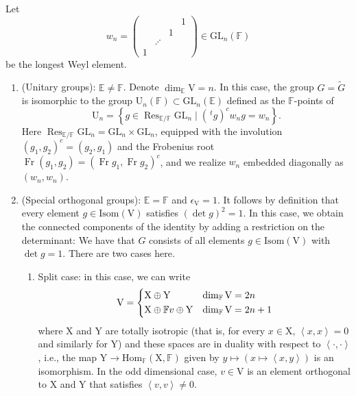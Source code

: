 \documentclass[12pt, reqno]{amsart}
\theoremstyle{definition}
\theoremstyle{definition}
\theoremstyle{definition}
\newcommand{\Hom}{\mathrm{Hom}}
\newcommand{\hermitianSpace}{\mathrm{V}}
\newcommand{\xIsotropic}{\mathrm{X}}
\newcommand{\yIsotropic}{\mathrm{Y}}
\newcommand{\innerproduct}[2]{\left\langle #1,#2\right\rangle}
\newcommand{\transpose}[1]{\, {}^{t}#1}
\newcommand{\involution}[1]{#1^{c}}
\newcommand{\GL}{\mathrm{GL}}
\newcommand{\UnitaryGroup}{\mathrm{U}}
\newcommand{\GroupExtension}[1]{\widetilde{#1}}
\newcommand{\finiteField}{\mathbb{F}}
\newcommand{\quadraticExtension}{\mathbb{E}}
\newcommand{\Frobenius}{\operatorname{Fr}}
\newcommand{\restrictionOfScalars}[3]{\operatorname{Res}_{#1 \slash #2}{#3}}
\newcommand{\IsometryGroup}{\mathrm{Isom}}
\newcommand{\algebraicGroup}[1]{\boldsymbol{\mathrm{#1}}}
\begin{document}
Let $$w_n = \begin{pmatrix}
	& & & 1\\
	& & 1\\
	& \iddots\\
	1
\end{pmatrix} \in \GL_n\left(\finiteField\right)$$ be the longest Weyl element.
\begin{enumerate}
	\item (Unitary groups): $\quadraticExtension \ne \finiteField$. Denote $\dim_{\quadraticExtension} \hermitianSpace = n$. In this case, the group $G = \GroupExtension{G}$ is isomorphic to the group $\UnitaryGroup_n\left(\finiteField\right) \subset\GL_{n}\left(\quadraticExtension\right)$ defined as the $\finiteField$-points of $$\algebraicGroup{\UnitaryGroup}_n = \left\{ g \in \restrictionOfScalars{\quadraticExtension}{\finiteField}{\algebraicGroup{\GL}_n} \mid \involution{\left(\transpose{g}\right)} w_n g = w_n \right\}.$$
	Here $\restrictionOfScalars{\quadraticExtension}{\finiteField} {\algebraicGroup{\GL}}_n = \algebraicGroup{\GL}_n \times \algebraicGroup{\GL}_n$, equipped with the involution $\involution{\left(g_1,g_2\right)} = \left(g_2, g_1\right)$ and the Frobenius root $\Frobenius \left(g_1, g_2\right) = \involution{\left(\Frobenius g_1, \Frobenius g_2\right)}$, and we realize $w_n$ embedded diagonally as $\left(w_n, w_n\right)$.
	\item (Special orthogonal groups): $\quadraticExtension = \finiteField$ and $\epsilon_{\hermitianSpace} = 1$. It follows by definition that every element $g \in \IsometryGroup\left(\hermitianSpace\right)$ satisfies $\left(\det g\right)^2 = 1$.  In this case, we obtain the connected components of the identity by adding a restriction on the determinant: We have that $G$ consists of all elements $g \in \IsometryGroup\left(\hermitianSpace\right)$ with $\det g = 1$. There are two cases here.
	\begin{enumerate}
		\item Split case: in this case, we can write $$\hermitianSpace = \begin{dcases}
		\xIsotropic \oplus \yIsotropic & \dim_{\finiteField} \hermitianSpace = 2n\\
		\xIsotropic \oplus \finiteField v \oplus \yIsotropic & \dim_{\finiteField}\hermitianSpace = 2n + 1
		\end{dcases}$$ where $\xIsotropic$ and $\yIsotropic$ are totally isotropic (that is, for every $x \in \xIsotropic$, $\innerproduct{x}{x} = 0$ and similarly for $\yIsotropic$) and these spaces are in duality with respect to $\innerproduct{\cdot}{\cdot}$, i.e., the map $\yIsotropic \to \Hom_{\finiteField}\left(\xIsotropic, \finiteField\right)$ given by $y \mapsto \left(x \mapsto \innerproduct{x}{y}\right)$ is an isomorphism. In the odd dimensional case, $v \in \hermitianSpace$ is an element orthogonal to $\xIsotropic$ and $\yIsotropic$ that satisfies $\innerproduct{v}{v} \ne 0$.
		

\end{enumerate}
\end{enumerate}
\end{document}
